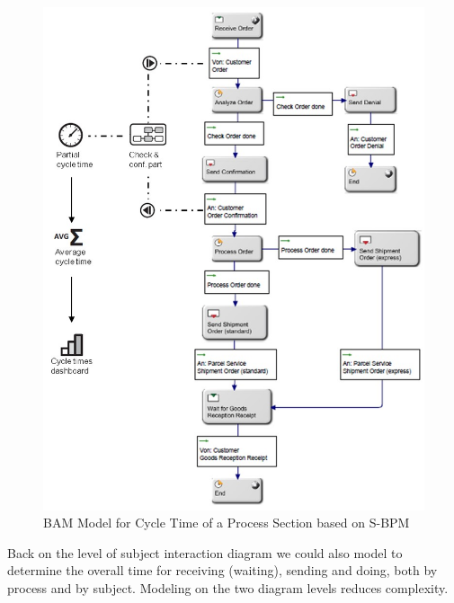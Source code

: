\begin{figure}[htbp]
	\centering
	\includegraphics[width=0.9\linewidth]{Figures/Chapter5/Monitoring/BAM-Model-for-Cycle-Time-of-a-Process-Section-based-on-S-BPM.jpg}
	\caption[BAM Model for Cycle Time of a Process Section based on S-BPM]{BAM Model for Cycle Time of a Process Section based on S-BPM}
	\label{fig:BAM-Cycle-Time}
\end{figure}

Back on the level of subject interaction diagram we could also model to determine the overall time for receiving (waiting), sending and doing, both by process and by subject. Modeling on the two diagram levels reduces complexity.

